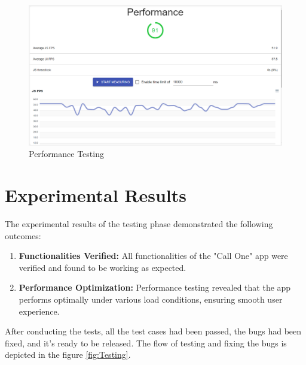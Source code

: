 \begin{figure}
    \centering
    \includegraphics[width=1\linewidth]{Media//Chapter 6/performance.png}
    \caption{Performance Testing}
    \label{fig: Performance Testing}
\end{figure}

\section{Experimental Results}

The experimental results of the testing phase demonstrated the following outcomes:

\begin{enumerate}[label=\roman*.]
    \item \textbf{Functionalities Verified:} All functionalities of the "Call One" app were verified and found to be working as expected.
    
    \item \textbf{Performance Optimization:} Performance testing revealed that the app performs optimally under various load conditions, ensuring smooth user experience.
    
\end{enumerate}

After conducting the tests, all the test cases had been passed, the bugs had been fixed, and it's ready to be released. The flow of testing and fixing the bugs is depicted in the figure \ref{fig:Testing}.


